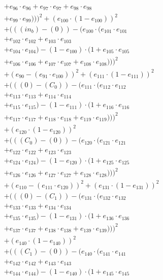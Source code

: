 \documentclass[10pt, a4paper]{article}
\begin{document}
\begin{align*}
& + e_{96} \cdot e_{96} + e_{97} \cdot e_{97} + e_{98} \cdot e_{98} \\
& + e_{99} \cdot e_{99})))^{2} + (e_{100} \cdot (1 - e_{100}))^{2} \\
& + (((in_b) - (0)) - (e_{100} \cdot (e_{101} \cdot e_{101} \\
& + e_{102} \cdot e_{102} + e_{103} \cdot e_{103} \\
& + e_{104} \cdot e_{104}) - (1 - e_{100}) \cdot (1 + e_{105} \cdot e_{105} \\
& + e_{106} \cdot e_{106} + e_{107} \cdot e_{107} + e_{108} \cdot e_{108})))^{2} \\
& + (e_{90} - (e_{91} \cdot e_{100}))^{2} + (e_{111} \cdot (1 - e_{111}))^{2} \\
& + (((0) - (C_{0})) - (e_{111} \cdot (e_{112} \cdot e_{112} \\
& + e_{113} \cdot e_{113} + e_{114} \cdot e_{114} \\
& + e_{115} \cdot e_{115}) - (1 - e_{111}) \cdot (1 + e_{116} \cdot e_{116} \\
& + e_{117} \cdot e_{117} + e_{118} \cdot e_{118} + e_{119} \cdot e_{119})))^{2} \\
& + (e_{120} \cdot (1 - e_{120}))^{2} \\
& + (((C_{0}) - (0)) - (e_{120} \cdot (e_{121} \cdot e_{121} \\
& + e_{122} \cdot e_{122} + e_{123} \cdot e_{123} \\
& + e_{124} \cdot e_{124}) - (1 - e_{120}) \cdot (1 + e_{125} \cdot e_{125} \\
& + e_{126} \cdot e_{126} + e_{127} \cdot e_{127} + e_{128} \cdot e_{128})))^{2} \\
& + (e_{110} - (e_{111} \cdot e_{120}))^{2} + (e_{131} \cdot (1 - e_{131}))^{2} \\
& + (((0) - (C_{1})) - (e_{131} \cdot (e_{132} \cdot e_{132} \\
& + e_{133} \cdot e_{133} + e_{134} \cdot e_{134} \\
& + e_{135} \cdot e_{135}) - (1 - e_{131}) \cdot (1 + e_{136} \cdot e_{136} \\
& + e_{137} \cdot e_{137} + e_{138} \cdot e_{138} + e_{139} \cdot e_{139})))^{2} \\
& + (e_{140} \cdot (1 - e_{140}))^{2} \\
& + (((C_{1}) - (0)) - (e_{140} \cdot (e_{141} \cdot e_{141} \\
& + e_{142} \cdot e_{142} + e_{143} \cdot e_{143} \\
& + e_{144} \cdot e_{144}) - (1 - e_{140}) \cdot (1 + e_{145} \cdot e_{145} \\

\end{align*}
\end{document}
